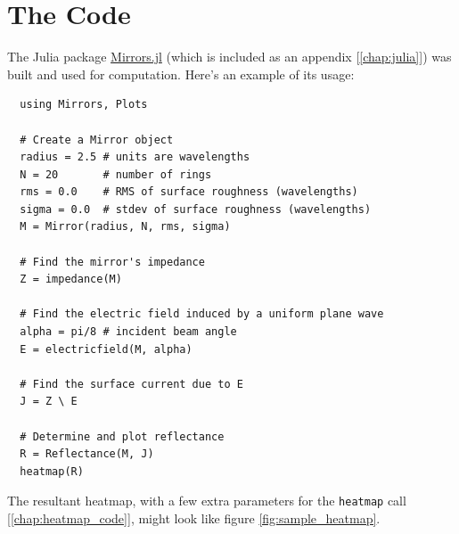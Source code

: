 \documentclass[etd,twoside,senior]{BYUPhys}
\begin{document}

\section{The Code}\label{sec:code}

The Julia package \href{https://github.com/mjg0/Mirrors.jl}{Mirrors.jl} (which is included as an appendix [\ref{chap:julia}]) was built and used for computation. Here's an example of its usage:

\begin{verbatim}
  using Mirrors, Plots

  # Create a Mirror object
  radius = 2.5 # units are wavelengths
  N = 20       # number of rings
  rms = 0.0    # RMS of surface roughness (wavelengths)
  sigma = 0.0  # stdev of surface roughness (wavelengths)
  M = Mirror(radius, N, rms, sigma)

  # Find the mirror's impedance
  Z = impedance(M)

  # Find the electric field induced by a uniform plane wave
  alpha = pi/8 # incident beam angle
  E = electricfield(M, alpha)

  # Find the surface current due to E
  J = Z \ E

  # Determine and plot reflectance
  R = Reflectance(M, J)
  heatmap(R)
\end{verbatim}

The resultant heatmap, with a few extra parameters for the \texttt{heatmap} call [\ref{chap:heatmap_code}], might look like figure \ref{fig:sample_heatmap}.
\end{document}
